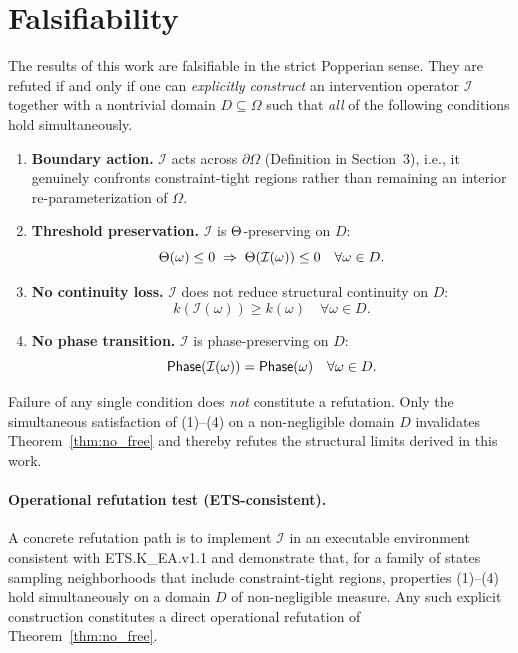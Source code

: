 ﻿\section{Falsifiability}

The results of this work are falsifiable in the strict Popperian sense.
They are refuted if and only if one can \emph{explicitly construct} an
intervention operator $\mathcal{I}$ together with a nontrivial domain
$D\subseteq\Omega$ such that \emph{all} of the following conditions hold
simultaneously.

\begin{enumerate}
\item \textbf{Boundary action.}
$\mathcal{I}$ acts across $\partial\Omega$ (Definition in Section~3), i.e., it
genuinely confronts constraint-tight regions rather than remaining an interior
re-parameterization of $\Omega$.

\item \textbf{Threshold preservation.}
$\mathcal{I}$ is $\Theta$-preserving on $D$:
\[
\Theta(\omega)\le 0 \;\Rightarrow\;
\Theta(\mathcal{I}(\omega))\le 0
\quad \forall \omega\in D.
\]

\item \textbf{No continuity loss.}
$\mathcal{I}$ does not reduce structural continuity on $D$:
\[
k(\mathcal{I}(\omega)) \ge k(\omega)
\quad \forall \omega\in D.
\]

\item \textbf{No phase transition.}
$\mathcal{I}$ is phase-preserving on $D$:
\[
\mathsf{Phase}(\mathcal{I}(\omega))=\mathsf{Phase}(\omega)
\quad \forall \omega\in D.
\]
\end{enumerate}

Failure of any single condition does \emph{not} constitute a refutation.
Only the simultaneous satisfaction of (1)--(4) on a non-negligible domain $D$
invalidates Theorem~\ref{thm:no_free} and thereby refutes the structural limits
derived in this work.

\paragraph{Operational refutation test (ETS-consistent).}
A concrete refutation path is to implement $\mathcal{I}$ in an executable
environment consistent with ETS.K\_EA.v1.1 and demonstrate that, for a family of
states sampling neighborhoods that include constraint-tight regions, properties
(1)--(4) hold simultaneously on a domain $D$ of non-negligible measure.
Any such explicit construction constitutes a direct operational refutation of
Theorem~\ref{thm:no_free}.
